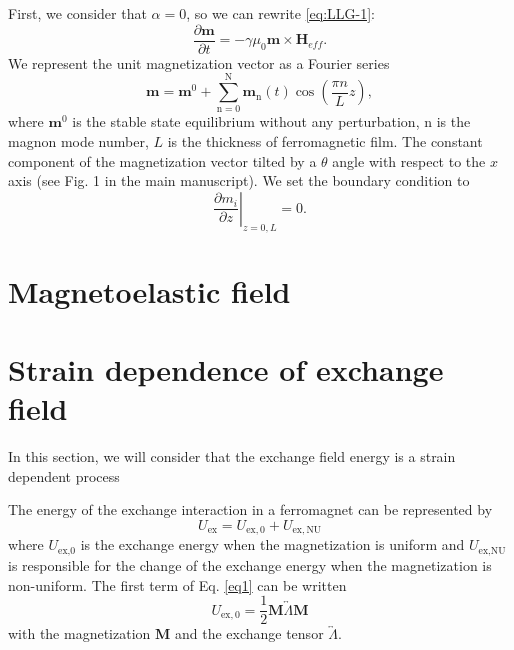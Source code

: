 \documentclass[aps,prl,amsmath,amssymb,preprint,superscriptaddress]{revtex4-1}
\begin{document}
First, we consider that $\alpha = 0$, so we can rewrite \ref{eq:LLG-1}:
\begin{equation}
    \frac{\partial \mathbf{m}}{\partial t} = - \gamma \mu_0 \mathbf{m} \times \mathbf{H}_{eff}.
    \label{eq:LLG-2}
\end{equation}
We represent the unit magnetization vector as a Fourier series
\begin{equation}
    \mathbf{m} = \mathbf{m}^0 + \sum_{\mathrm{n=0}}^\mathrm{N} \mathbf{m}_{\mathrm{n}} \left( t \right) \cos \left( \frac{\pi n}{L} z \right),
    \label{eq:mFourier}
\end{equation}
where $\mathbf{m}^0$ is the stable state equilibrium without any perturbation, n is the magnon mode number, $L$ is the thickness of ferromagnetic film. 
The constant component of the magnetization vector tilted by a $\theta$ angle with respect to the $x$ axis (see Fig. 1 in the main manuscript).
We set the boundary condition to
\begin{equation}
    \left. \frac{\partial m_i}{ \partial z} \right|_{z = 0,L} =0.
\end{equation}

\section{Magnetoelastic field}


\section{Strain dependence of exchange field}

In this section, we will consider that the exchange field energy is a strain dependent process

The energy of the exchange interaction in a ferromagnet can be represented by \cite{gurevich1996magnetization}
\begin{equation}
    U_{\mathrm{ex}} = U_{\mathrm{ex,0}} + U_{\mathrm{ex,NU}}
    \label{eq1}
\end{equation}
where $U_{\textrm{ex,0}}$ is the exchange energy when the magnetization is uniform and $U_{\textrm{ex,NU}}$ is responsible for the change of the exchange energy when the magnetization is non-uniform.
The first term of Eq. \eqref{eq1} can be written
\begin{equation}
    U_{\mathrm{ex,0}} = \frac{1}{2} \mathbf{M} \overleftrightarrow{\Lambda} \mathbf{M}
    \label{eq2}
\end{equation}
with the magnetization $\mathbf{M}$ and the exchange tensor $\overleftrightarrow{\Lambda}$.
\end{document}
